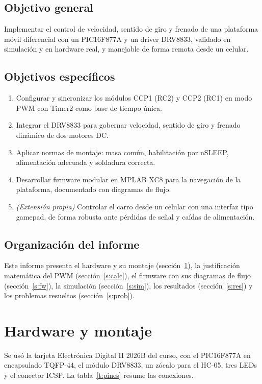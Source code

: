 \documentclass[conference,letterpaper]{IEEEtran}
\begin{document}
\subsection{Objetivo general}
Implementar el control de velocidad, sentido de giro y frenado de una
plataforma móvil diferencial con un PIC16F877A y un driver DRV8833, validado
en simulación y en hardware real, y manejable de forma remota desde un
celular.

\subsection{Objetivos específicos}
\begin{enumerate}
  \item[OE1.] Configurar y sincronizar los módulos CCP1 (RC2) y CCP2 (RC1) en
        modo PWM con Timer2 como base de tiempo única.
  \item[OE2.] Integrar el DRV8833 para gobernar velocidad, sentido de giro y
        frenado dinámico de dos motores DC.
  \item[OE3.] Aplicar normas de montaje: masa común, habilitación por
        nSLEEP, alimentación adecuada y soldadura correcta.
  \item[OE4.] Desarrollar firmware modular en MPLAB XC8 para la navegación de
        la plataforma, documentado con diagramas de flujo.
  \item[OE5.] \emph{(Extensión propia)} Controlar el carro desde un celular
        con una interfaz tipo gamepad, de forma robusta ante pérdidas de señal
        y caídas de alimentación.
\end{enumerate}

\subsection{Organización del informe}
Este informe presenta el hardware y su montaje (sección~\ref{s:hw}), la
justificación matemática del PWM (sección~\ref{s:calc}), el firmware con sus
diagramas de flujo (sección~\ref{s:fw}), la simulación
(sección~\ref{s:sim}), los resultados (sección~\ref{s:res}) y los problemas
resueltos (sección~\ref{s:prob}).

\section{Hardware y montaje}
\label{s:hw}

Se usó la tarjeta Electrónica Digital II 2026B del curso, con el PIC16F877A en
encapsulado TQFP-44, el módulo DRV8833, un zócalo para el HC-05, tres LEDs y el
conector ICSP. La tabla~\ref{t:pines} resume las conexiones.
\end{document}
